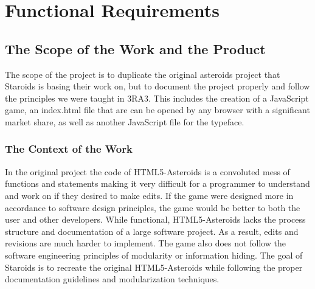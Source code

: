 \documentclass[12pt, titlepage]{article}
\begin{document}
\section{Functional Requirements}

\subsection{The Scope of the Work and the Product}
The scope of the project is to duplicate the original asteroids project that Staroids is basing their work on, but to document the project properly and follow the principles we were taught in 3RA3. This includes the creation of a JavaScript game, an index.html file that are can be opened by any browser with a significant market share, as well as another JavaScript file for the typeface.\\

\subsubsection{The Context of the Work}
In the original project the code of HTML5-Asteroids is a convoluted mess of functions and statements making it very difficult for a programmer to understand and work on if they desired to make edits. If the game were designed more in accordance to software design principles, the game would be better to both the user and other developers. While functional, HTML5-Asteroids lacks the process structure and documentation of a large software project. As a result, edits and revisions are much harder to implement. The game also does not follow the software engineering principles of modularity or information hiding. The goal of Staroids is to recreate the original HTML5-Asteroids while following the proper documentation guidelines and modularization techniques.\\
\end{document}
